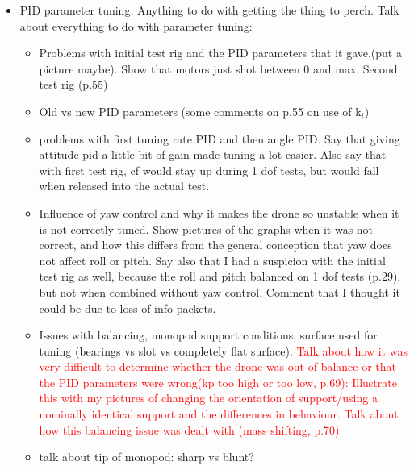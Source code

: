 \documentclass[12pt,a4paper]{article}
\begin{document}
\begin{itemize}
\item PID parameter tuning: Anything to do with getting the thing to perch. Talk about everything to do with parameter tuning:
\begin{itemize}
\item Problems with initial test rig and the PID parameters that it gave.(put a picture maybe). Show that motors just shot between 0 and max. Second test rig (p.55)
\item Old vs new PID parameters (some comments on p.55 on use of k$_i$)
\item problems with first tuning rate PID and then angle PID. Say that giving attitude pid a little bit of gain made tuning a lot easier. Also say that with first test rig, cf would stay up during 1 dof tests, but would fall when released into the actual test.
\item Influence of yaw control and why it makes the drone so unstable when it is not correctly tuned. Show pictures of the graphs when it was not correct, and how this differs from the general conception that yaw does not affect roll or pitch. Say also that I had a suspicion with the initial test rig as well, because the roll and pitch balanced on 1 dof tests (p.29), but not when combined without yaw control. Comment that I thought it could be due to loss of info packets.
\item Issues with balancing, monopod support conditions, surface used for tuning (bearings vs slot vs completely flat surface). \textcolor{red}{Talk about how it was very difficult to determine whether the drone was out of balance or that the PID parameters were wrong(kp too high or too low, p.69): Illustrate this with my pictures of changing the orientation of support/using a nominally identical support and the differences in behaviour. Talk about how this balancing issue was dealt with (mass shifting, p.70)}
\item talk about tip of monopod: sharp vs blunt?


\end{itemize}
\end{itemize}
\end{document}
